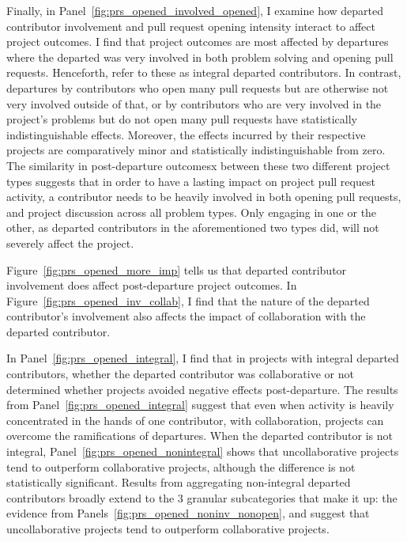 \documentclass[12pt,notitlepage]{article}
\begin{document}
Finally, in Panel~\ref{fig:prs_opened_involved_opened}, I examine how departed contributor involvement and pull request opening intensity interact to affect project outcomes. I find that project outcomes are most affected by departures where the departed was very involved in both problem solving and opening pull requests. Henceforth, refer to these as integral departed contributors. In contrast, departures by contributors who open many pull requests but are otherwise not very involved outside of that, or by contributors who are very involved in the project's problems but do not open many pull requests have statistically indistinguishable effects. Moreover, the effects incurred by their respective projects are comparatively minor and statistically indistinguishable from zero. The similarity in post-departure outcomesx between these two different project types suggests that in order to have a lasting impact on project pull request activity, a contributor needs to be heavily involved in both opening pull requests, and project discussion across all problem types. Only engaging in one or the other, as departed contributors in the aforementioned two types did, will not severely affect the project. 


Figure~\ref{fig:prs_opened_more_imp} tells us that departed contributor involvement does affect post-departure project outcomes. In Figure~\ref{fig:prs_opened_inv_collab}, I find that the nature of the departed contributor's involvement also affects the impact of collaboration with the departed contributor. 

In Panel~\ref{fig:prs_opened_integral}, I find that in projects with integral departed contributors, whether the departed contributor was collaborative or not determined whether projects avoided negative effects post-departure. The results from Panel~\ref{fig:prs_opened_integral} suggest that even when activity is heavily concentrated in the hands of one contributor, with collaboration, projects can overcome the ramifications of departures. When the departed contributor is not integral, Panel~\ref{fig:prs_opened_nonintegral} shows that uncollaborative projects tend to outperform collaborative projects, although the difference is not statistically significant. Results from aggregating non-integral departed contributors broadly extend to the 3 granular subcategories that make it up: the evidence from Panels~\ref{fig:prs_opened_noninv_nonopen},  and  suggest that uncollaborative projects tend to outperform collaborative projects. 
\end{document}
